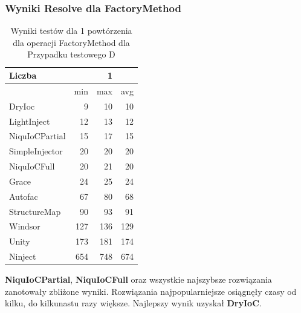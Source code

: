 \documentclass[12pt]{article}
\begin{document}
\subsubsection{Wyniki Resolve dla FactoryMethod}
\begin{table}[H]
\captionsetup{belowskip=0pt,aboveskip=0pt}
\begin{center}
\begin{small}
	\begin{tabular}{ | l | r r r | }
    		\hline
Liczba & & 1 & \\ \hline
 & min & max & avg \\ \hline
DryIoc & 9 & 10 & 10 \\ \hline
LightInject & 12 & 13 & 12 \\ \hline
NiquIoCPartial & 15 & 17 & 15 \\ \hline
SimpleInjector & 20 & 20 & 20 \\ \hline
NiquIoCFull & 20 & 21 & 20 \\ \hline
Grace & 24 & 25 & 24 \\ \hline
Autofac & 67 & 80 & 68 \\ \hline
StructureMap & 90 & 93 & 91 \\ \hline
Windsor & 127 & 136 & 129 \\ \hline
Unity & 173 & 181 & 174 \\ \hline
Ninject & 654 & 748 & 674 \\ \hline
  	\end{tabular}
\end{small}
\end{center}
\caption{Wyniki testów dla 1 powtórzenia dla operacji FactoryMethod dla Przypadku testowego D}
\label{TestCaseB_FactoryMethod1}
\end{table}
\textbf{NiquIoCPartial}, \textbf{NiquIoCFull} oraz wszystkie najszybsze rozwiązania zanotowały zbliżone wyniki. Rozwiązania najpopularniejsze osiągnęły czasy od kilku, do kilkunastu razy większe. Najlepszy wynik uzyskał \textbf{DryIoC}.
\\ \\
\end{document}
